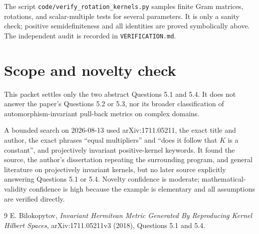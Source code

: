 \documentclass[11pt]{article}
\begin{document}
The script \texttt{code/verify\_rotation\_kernels.py} samples finite Gram
matrices, rotations, and scalar-multiple tests for several parameters.  It is
only a sanity check; positive semidefiniteness and all identities are proved
symbolically above.  The independent audit is recorded in
\texttt{VERIFICATION.md}.

\section{Scope and novelty check}
This packet settles only the two abstract Questions 5.1 and 5.4.  It does not
answer the paper's Questions 5.2 or 5.3, nor its broader classification of
automorphism-invariant pull-back metrics on complex domains.

A bounded search on 2026-08-13 used arXiv:1711.05211, the exact title and
author, the exact phrases ``equal multipliers'' and ``does it follow that
$K$ is a constant'', and projectively invariant positive-kernel keywords.
It found the source, the author's dissertation repeating the surrounding
program, and general literature on projectively invariant kernels, but no
later source explicitly answering Questions 5.1 or 5.4.  Novelty confidence
is moderate; mathematical-validity confidence is high because the example is
elementary and all assumptions are verified directly.

\enlargethispage{4\baselineskip}
\begin{thebibliography}{9}
E. Bilokopytov,
\emph{Invariant Hermitean Metric Generated By Reproducing Kernel Hilbert
Spaces}, arXiv:1711.05211v3 (2018), Questions 5.1 and 5.4.
\end{thebibliography}
\end{document}
